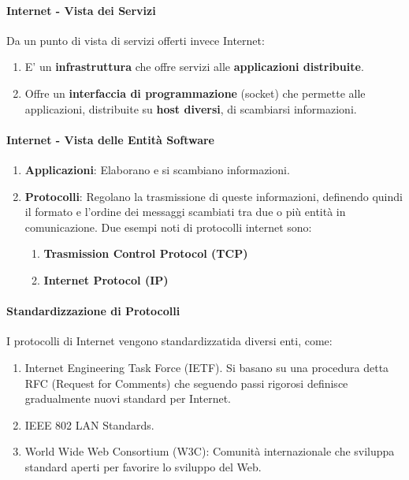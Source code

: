 \documentclass{article}
\begin{document}
\paragraph{Internet - Vista dei Servizi} Da un punto di vista di servizi offerti invece
Internet:

\begin{enumerate}
    \item E' un \textbf{infrastruttura} che offre servizi alle \textbf{applicazioni distribuite}.
    \item Offre un \textbf{interfaccia di programmazione} (socket) che permette alle applicazioni, distribuite
    su \textbf{host diversi}, di scambiarsi informazioni.
\end{enumerate}

\paragraph{Internet - Vista delle Entità Software}

\begin{enumerate}
    \item \textbf{Applicazioni}: Elaborano e si scambiano informazioni.
    \item \textbf{Protocolli}: Regolano la trasmissione di queste informazioni, definendo
    quindi il formato e l'ordine dei messaggi scambiati tra due o più entità in comunicazione. Due esempi
    noti di protocolli internet sono:
    \begin{enumerate}
        \item \textbf{Trasmission Control Protocol (TCP)}
        \item \textbf{Internet Protocol (IP)}
    \end{enumerate}
\end{enumerate}

\paragraph{Standardizzazione di Protocolli} I protocolli di Internet vengono standardizzatida diversi enti, come:

\begin{enumerate}
    \item Internet Engineering Task Force (IETF). Si basano su una procedura detta RFC (Request for Comments)
    che seguendo passi rigorosi definisce gradualmente nuovi standard per Internet.
    \item IEEE 802 LAN Standards.
    \item World Wide Web Consortium (W3C): Comunità internazionale che sviluppa standard aperti per favorire
    lo sviluppo del Web.
\end{enumerate}
\end{document}
